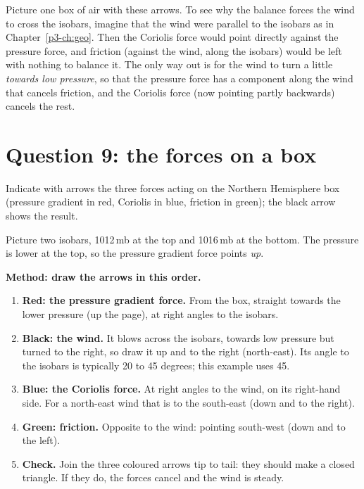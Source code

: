 Picture one box of air with these arrows. To see why the balance forces the wind to cross the isobars, imagine that the wind were parallel to the isobars as in Chapter~\ref{p3-ch:geo}. Then the Coriolis force would point directly against the pressure force, and friction (against the wind, along the isobars) would be left with nothing to balance it. The only way out is for the wind to turn a little \emph{towards low pressure}, so that the pressure force has a component along the wind that cancels friction, and the Coriolis force (now pointing partly backwards) cancels the rest.

\section{Question 9: the forces on a box}\label{p3-sec:fig5}

\begin{questionbox}
Indicate with arrows the three forces acting on the Northern Hemisphere box (pressure gradient in red, Coriolis in blue, friction in green); the black arrow shows the result.
\end{questionbox}

Picture two isobars, 1012\,mb at the top and 1016\,mb at the bottom. The pressure is lower at the top, so the pressure gradient force points \emph{up}.

\textbf{Method: draw the arrows in this order.}
\begin{enumerate}[label=\textbf{Step \arabic*.},leftmargin=*,itemsep=3pt]
\item \textbf{Red: the pressure gradient force.} From the box, straight towards the lower pressure (up the page), at right angles to the isobars.
\item \textbf{Black: the wind.} It blows across the isobars, towards low pressure but turned to the right, so draw it up and to the right (north-east). Its angle to the isobars is typically 20 to 45 degrees; this example uses 45\deg.
\item \textbf{Blue: the Coriolis force.} At right angles to the wind, on its right-hand side. For a north-east wind that is to the south-east (down and to the right).
\item \textbf{Green: friction.} Opposite to the wind: pointing south-west (down and to the left).
\item \textbf{Check.} Join the three coloured arrows tip to tail: they should make a closed triangle. If they do, the forces cancel and the wind is steady.
\end{enumerate}

